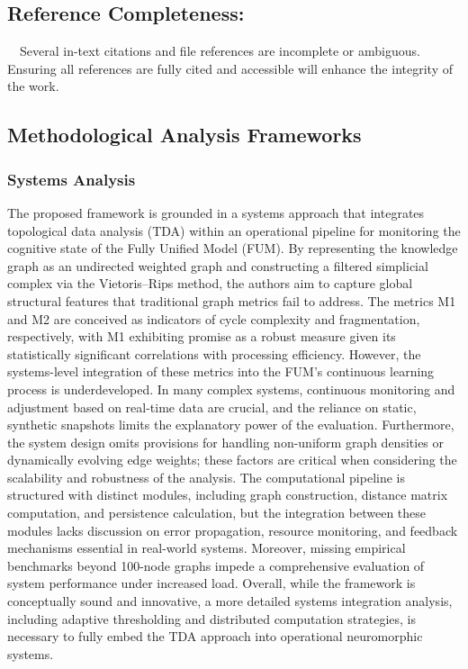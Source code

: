 \documentclass[12pt]{article}
\begin{document}
\subsection{Reference Completeness:  }
 Several in-text citations and file references are incomplete or ambiguous. Ensuring all references are fully cited and accessible will enhance the integrity of the work.

\hrulefill
\subsection{Methodological Analysis Frameworks}

\subsubsection{Systems Analysis  }
The proposed framework is grounded in a systems approach that integrates topological data analysis (TDA) within an operational pipeline for monitoring the cognitive state of the Fully Unified Model (FUM). By representing the knowledge graph as an undirected weighted graph and constructing a filtered simplicial complex via the Vietoris–Rips method, the authors aim to capture global structural features that traditional graph metrics fail to address. The metrics M1 and M2 are conceived as indicators of cycle complexity and fragmentation, respectively, with M1 exhibiting promise as a robust measure given its statistically significant correlations with processing efficiency. However, the systems-level integration of these metrics into the FUM’s continuous learning process is underdeveloped. In many complex systems, continuous monitoring and adjustment based on real-time data are crucial, and the reliance on static, synthetic snapshots limits the explanatory power of the evaluation. Furthermore, the system design omits provisions for handling non-uniform graph densities or dynamically evolving edge weights; these factors are critical when considering the scalability and robustness of the analysis. The computational pipeline is structured with distinct modules, including graph construction, distance matrix computation, and persistence calculation, but the integration between these modules lacks discussion on error propagation, resource monitoring, and feedback mechanisms essential in real-world systems. Moreover, missing empirical benchmarks beyond 100-node graphs impede a comprehensive evaluation of system performance under increased load. Overall, while the framework is conceptually sound and innovative, a more detailed systems integration analysis, including adaptive thresholding and distributed computation strategies, is necessary to fully embed the TDA approach into operational neuromorphic systems.
\end{document}

